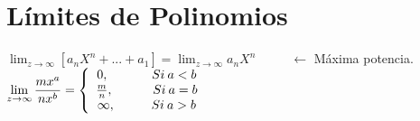 \documentclass[12pt,a4paper]{article}
\begin{document}
    \section{\textcolor{violeta}{Límites de Polinomios}}
    \begin{tcolorbox}[colback=white!5!white,colframe=violeta!75!black]
        \centering
        $\displaystyle\lim_{z\to{\infty}}\left[a_nX^n+...+a_1\right]=\displaystyle\lim_{z\to{\infty}}{a_nX^n}\hspace{1cm} $ $\leftarrow$ Máxima potencia. \\ \vspace{0.5cm}
        $\displaystyle\lim_{z\to{\infty}}{\frac{mx^a}{nx^b}}=\left\lbrace\begin{array}{c}0,\hspace{1.2cm}Si\:a<b\\\frac{m}{n},\hspace{1.1cm}Si\:a=b\\\infty,\hspace{1cm}Si\:a>b\end{array} \right.  $
    \end{tcolorbox}
\end{document}
